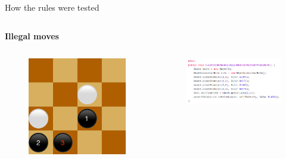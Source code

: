 \documentclass{beamer}
\begin{document}
\begin{frame}[t]{How the rules were tested }
\begin{columns}
 \end{columns}
 
 \textbf{Illegal moves}
 \begin{columns}
  \begin{figure}[t]
   \includegraphics[scale=0.24]{images/illegal_weak.png}
  \end{figure}
  \begin{figure}
   \includegraphics[scale=0.27]{images/test-illegal-weak.png}
  \end{figure}
  
 \end{columns}
 
 
 
 
\end{frame}
\end{document}
